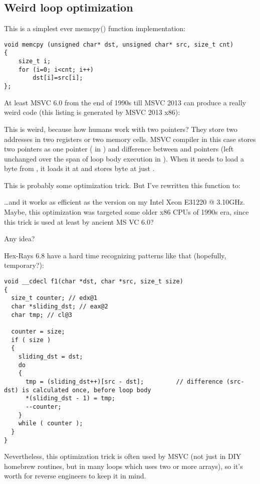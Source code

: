 \subsection{Weird loop optimization}

This is a simplest ever memcpy() function implementation:

\begin{lstlisting}
void memcpy (unsigned char* dst, unsigned char* src, size_t cnt)
{
	size_t i;
	for (i=0; i<cnt; i++)
		dst[i]=src[i];
};
\end{lstlisting}

At least MSVC 6.0 from the end of 1990s till MSVC 2013 can produce a really weird code (this listing is generated by MSVC 2013 x86):



This is weird, because how humans work with two pointers? They store two addresses in two registers or two memory cells.
MSVC compiler in this case stores two pointers as one pointer ( in \EAX) 
and difference between  and  pointers (left unchanged over the span of loop body execution in \ESI).
When it needs to load a byte from , it loads it at  and stores byte
at just .

This is probably some optimization trick. But I've rewritten this function to:



\dots and it works as efficient as the  version on my Intel Xeon E31220 @ 3.10GHz.
Maybe, this optimization was targeted some older x86 CPUs of 1990s era, since this trick is used at least by ancient MS VC 6.0?

Any idea?

Hex-Rays 6.8 have a hard time recognizing patterns like that (hopefully, temporary?):

\begin{lstlisting}
void __cdecl f1(char *dst, char *src, size_t size)
{
  size_t counter; // edx@1
  char *sliding_dst; // eax@2
  char tmp; // cl@3

  counter = size;
  if ( size )
  {
    sliding_dst = dst;
    do
    {
      tmp = (sliding_dst++)[src - dst];         // difference (src-dst) is calculated once, before loop body
      *(sliding_dst - 1) = tmp;
      --counter;
    }
    while ( counter );
  }
}
\end{lstlisting}

Nevertheless, this optimization trick is often used by MSVC (not just in \ac{DIY} homebrew  routines,
but in many loops which uses two or more arrays),
so it's worth for reverse engineers to keep it in mind.


